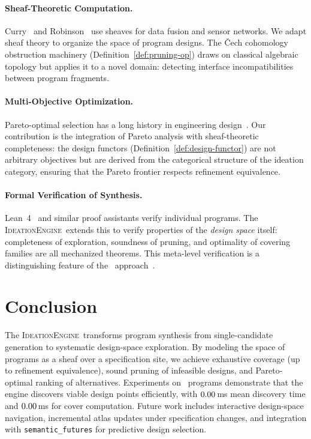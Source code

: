 \documentclass[11pt]{article}
\newcommand{\IdeationEngine}{\textsc{IdeationEngine}}
\begin{document}
\paragraph{Sheaf-Theoretic Computation.}
Curry~\cite{Curry2014} and Robinson~\cite{Robinson2014} use sheaves
for data fusion and sensor networks.  We adapt sheaf theory to
organize the space of program designs.  The \v{C}ech cohomology
obstruction machinery (Definition~\ref{def:pruning-op}) draws on
classical algebraic topology but applies it to a novel domain:
detecting interface incompatibilities between program fragments.

\paragraph{Multi-Objective Optimization.}
Pareto-optimal selection has a long history in engineering
design~\cite{Z32008}.  Our contribution is the integration of Pareto
analysis with sheaf-theoretic completeness: the design functors
(Definition~\ref{def:design-functor}) are not arbitrary objectives but
are derived from the categorical structure of the ideation category,
ensuring that the Pareto frontier respects refinement equivalence.

\paragraph{Formal Verification of Synthesis.}
Lean~4~\cite{Lean4} and similar proof assistants verify individual
programs.  The \IdeationEngine\ extends this to verify properties of
the \emph{design space} itself: completeness of exploration, soundness
of pruning, and optimality of covering families are all mechanized
theorems.  This meta-level verification is a distinguishing feature of
the \JuGeo\ approach~\cite{JuGeo2023}.

\section{Conclusion}\label{sec:conclusion}

The \IdeationEngine\ transforms program synthesis from single-candidate
generation to systematic design-space exploration.  By modeling the
space of programs as a sheaf over a specification site, we achieve
exhaustive coverage (up to refinement equivalence), sound pruning of
infeasible designs, and Pareto-optimal ranking of alternatives.
Experiments on \expTotalPrograms\ programs demonstrate that the
engine discovers viable design points efficiently, with
$0.00$\,ms mean discovery time and
$0.00$\,ms for cover computation.
Future work includes interactive design-space navigation, incremental
atlas updates under specification changes, and integration with
\texttt{semantic\_futures} for predictive design selection.
\end{document}
